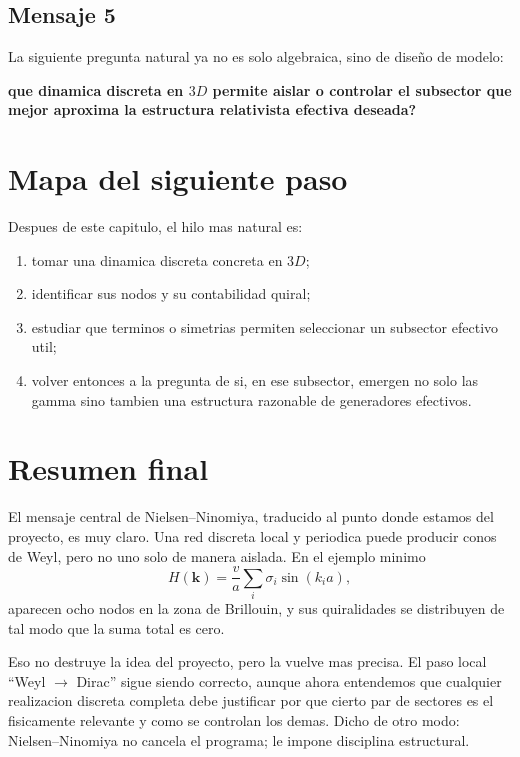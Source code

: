 \subsection*{Mensaje 5}
La siguiente pregunta natural ya no es solo algebraica, sino de diseño de modelo:
\begin{displayquote}
\textbf{que dinamica discreta en \(3D\) permite aislar o controlar el subsector que mejor aproxima la estructura relativista efectiva deseada?}
\end{displayquote}

\section{Mapa del siguiente paso}
Despues de este capitulo, el hilo mas natural es:
\begin{enumerate}[label=\arabic*.]
    \item tomar una dinamica discreta concreta en \(3D\);
    \item identificar sus nodos y su contabilidad quiral;
    \item estudiar que terminos o simetrias permiten seleccionar un subsector efectivo util;
    \item volver entonces a la pregunta de si, en ese subsector, emergen no solo las gamma sino tambien una estructura razonable de generadores efectivos.
\end{enumerate}

\section{Resumen final}
El mensaje central de Nielsen--Ninomiya, traducido al punto donde estamos del proyecto, es muy claro. Una red discreta local y periodica puede producir conos de Weyl, pero no uno solo de manera aislada. En el ejemplo minimo
\[
H(\bm{k})=\frac{v}{a}\sum_i \sigma_i \sin(k_i a),
\]
aparecen ocho nodos en la zona de Brillouin, y sus quiralidades se distribuyen de tal modo que la suma total es cero.

Eso no destruye la idea del proyecto, pero la vuelve mas precisa. El paso local \enquote{Weyl \(\to\) Dirac} sigue siendo correcto, aunque ahora entendemos que cualquier realizacion discreta completa debe justificar por que cierto par de sectores es el fisicamente relevante y como se controlan los demas. Dicho de otro modo: Nielsen--Ninomiya no cancela el programa; le impone disciplina estructural.
